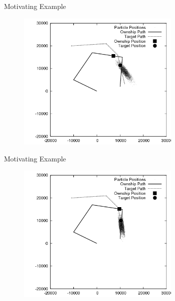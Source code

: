 \documentclass{beamer}
\begin{document}
\begin{frame}{Motivating Example}
\begin{figure}
\centering
\includegraphics[width=0.7\textwidth]{data/azimuth_only_2700.png}
\end{figure}
\end{frame}


\begin{frame}{Motivating Example}
\begin{figure}
\centering
\includegraphics[width=0.7\textwidth]{data/azimuth_only_2900.png}
\end{figure}
\end{frame}

\end{document}
